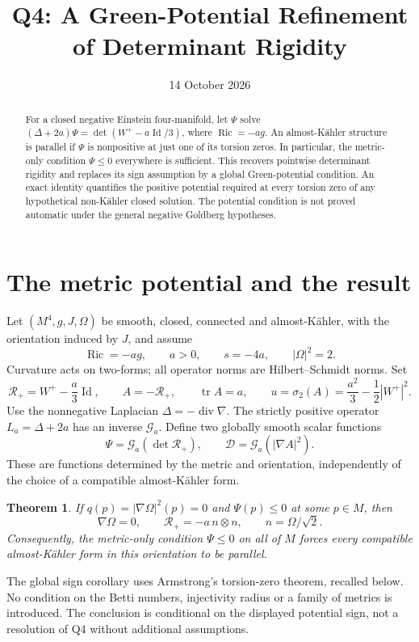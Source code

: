 \documentclass[11pt]{article}
\title{Q4: A Green-Potential Refinement\\of Determinant Rigidity}
\author{}
\date{14 October 2026}
\newtheorem{theorem}{Theorem}[section]
\theoremstyle{remark}\newtheorem{remark}[theorem]{Remark}
\newcommand{\Ric}{\operatorname{Ric}}
\newcommand{\tr}{\operatorname{tr}}
\newcommand{\Id}{\operatorname{Id}}
\newcommand{\RR}{\mathcal R_+}
\begin{document}
\maketitle
\begin{abstract}
For a closed negative Einstein four-manifold, let $\Psi$ solve
$(\Delta+2a)\Psi=\det(W^+-a\Id/3)$, where $\Ric=-ag$.
An almost-K\"ahler structure is parallel if $\Psi$ is nonpositive at
just one of its torsion zeros. In particular, the metric-only condition
$\Psi\le0$ everywhere is sufficient. This recovers pointwise determinant
rigidity and replaces its sign assumption by a global Green-potential
condition. An exact identity quantifies the positive potential required
at every torsion zero of any hypothetical non-K\"ahler closed solution.
The potential condition is not proved automatic under the general
negative Goldberg hypotheses.
\end{abstract}

\section{The metric potential and the result}
Let $(M^4,g,J,\Omega)$ be smooth, closed, connected and almost-K\"ahler,
with the orientation induced by $J$, and assume
\[
 \Ric=-ag,\qquad a>0,\qquad s=-4a,\qquad |\Omega|^2=2.
\]
Curvature acts on two-forms; all operator norms are Hilbert--Schmidt
norms. Set
\[
 \RR=W^+-\frac a3\Id,\qquad A=-\RR,\qquad
 \tr A=a,\qquad u=\sigma_2(A)=\frac{a^2}{3}-\frac12|W^+|^2.
\]
Use the nonnegative Laplacian $\Delta=-\operatorname{div}\nabla$.
The strictly positive operator $L_a=\Delta+2a$ has an inverse
$\mathcal G_a$. Define two globally smooth scalar functions
\begin{equation}\label{eq:potentials}
 \Psi=\mathcal G_a(\det\RR),\qquad
 \mathcal D=\mathcal G_a(|\nabla A|^2).
\end{equation}
These are functions determined by the metric and orientation, independently
of the choice of a compatible almost-K\"ahler form.

\begin{theorem}\label{thm:main}
If $q(p)=|\nabla\Omega|^2(p)=0$ and $\Psi(p)\le0$ at some $p\in M$,
then
\[
 \nabla\Omega=0,\qquad \RR=-a\,n\otimes n,
 \qquad n=\Omega/\sqrt2.
\]
Consequently, the metric-only condition $\Psi\le0$ on all of $M$
forces every compatible almost-K\"ahler form in this orientation to
be parallel.
\end{theorem}
The global sign corollary uses Armstrong's torsion-zero theorem, recalled
below. No condition on the Betti numbers, injectivity radius or a family
of metrics is introduced. The conclusion is conditional on the displayed
potential sign, not a resolution of Q4 without additional assumptions.
\end{document}
